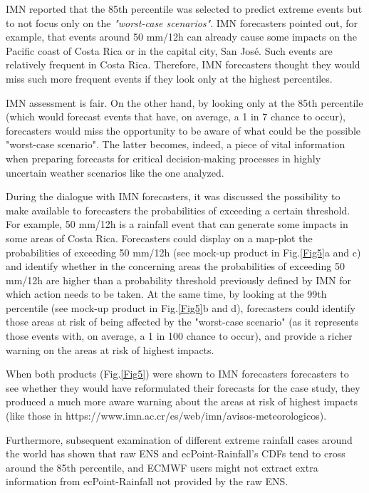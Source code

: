 \documentclass[twocol]{ametsocV5} %
\begin{document}
IMN reported that the 85th percentile was selected to predict extreme events but to not focus only on the \textit{"worst-case scenarios"}. IMN forecasters pointed out, for example, that events around 50 mm/12h can already cause some impacts on the Pacific coast of Costa Rica or in the capital city, San José. Such events are relatively frequent in Costa Rica. Therefore, IMN forecasters thought they would miss such more frequent events if they look only at the highest percentiles. \par
IMN assessment is fair. On the other hand, by looking only at the 85th percentile (which would forecast events that have, on average, a 1 in 7 chance to occur), forecasters would miss the opportunity to be aware of what could be the possible "worst-case scenario". The latter becomes, indeed, a piece of vital information when preparing forecasts for critical decision-making processes in highly uncertain weather scenarios like the one analyzed. \par
During the dialogue with IMN forecasters, it was discussed the possibility to make available to forecasters the probabilities of exceeding a certain threshold. For example, 50 mm/12h is a rainfall event that can generate some impacts in some areas of Costa Rica. Forecasters could display on a map-plot the probabilities of exceeding 50 mm/12h (see mock-up product in Fig.\ref{Fig5}a and c) and identify whether in the concerning areas the probabilities of exceeding 50 mm/12h are higher than a probability threshold previously defined by IMN for which action needs to be taken. At the same time, by looking at the 99th percentile (see mock-up product in Fig.\ref{Fig5}b and d), forecasters could identify those areas at risk of being affected by the "worst-case scenario" (as it represents those events with, on average, a 1 in 100 chance to occur), and provide a richer warning on the areas at risk of highest impacts. \par
When both products (Fig.\ref{Fig5}) were shown to IMN forecasters forecasters to see whether they would have reformulated their forecasts for the case study, they produced a much more aware warning about the areas at risk of highest impacts (like those in https://www.imn.ac.cr/es/web/imn/avisos-meteorologicos). \par
Furthermore, subsequent examination of different extreme rainfall cases around the world has shown that raw ENS and ecPoint-Rainfall’s CDFs tend to cross around the 85th percentile, and ECMWF users might not extract extra information from ecPoint-Rainfall not provided by the raw ENS.
\end{document}

